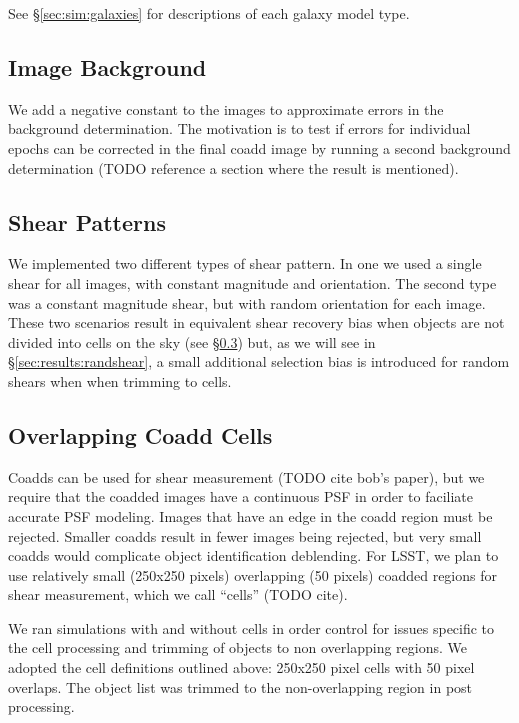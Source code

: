 \documentclass[iop, twocolappendix, appendixfloats, numberedappendix, apj]{hackemulateapj}
\begin{document}
See \S \ref{sec:sim:galaxies} for descriptions of each galaxy model type.

\subsection{Image Background} \label{sec:sim:bgerr}

We add a negative constant to the images to approximate errors in the
background determination.  The motivation is to test if errors for individual
epochs can be corrected in the final coadd image by running a second background
determination (TODO reference a section where the result is mentioned).

\subsection{Shear Patterns} \label{sec:sim:shears}

We implemented two different types of shear pattern.  In one we used a single
shear for all images, with constant magnitude and orientation.  The second type
was a constant magnitude shear, but with random orientation for each image.
These two scenarios result in equivalent shear recovery bias when objects are
not divided into cells on the sky (see \S \ref{sec:sim:cells}) but, as we will
see in \S \ref{sec:results:randshear}, a small additional selection bias is
introduced for random shears when when trimming to cells.

\subsection{Overlapping Coadd Cells} \label{sec:sim:cells}

Coadds can be used for shear measurement (TODO cite bob's paper), but we
require that the coadded images have a continuous PSF in order to faciliate
accurate PSF modeling.  Images that have an edge in the coadd region must be
rejected.  Smaller coadds result in fewer images being rejected, but very small
coadds would complicate object identification deblending.  For LSST, we plan to
use relatively small (250x250 pixels) overlapping (50 pixels) coadded regions
for shear measurement, which we call ``cells'' (TODO cite).

We ran simulations with and without cells in order control for issues specific
to the cell processing and trimming of objects to non overlapping regions.  We
adopted the cell definitions outlined above: 250x250 pixel cells with 50 pixel
overlaps. The object list was trimmed to the non-overlapping region in post
processing.
\end{document}
